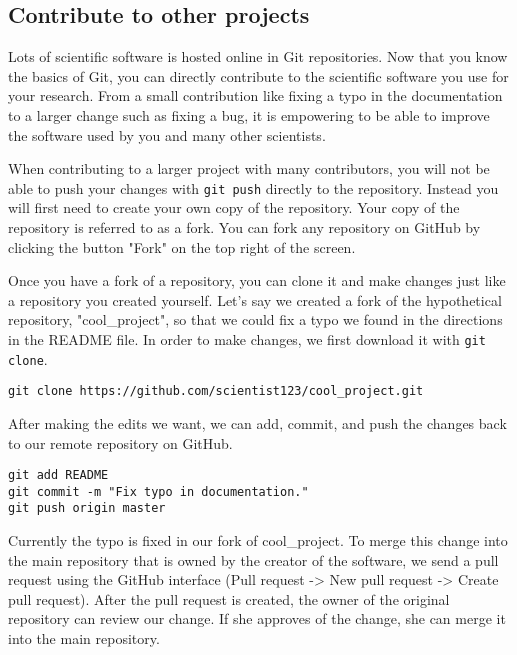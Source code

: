 \subsection{Contribute to other projects}

Lots of scientific software is hosted online in Git repositories.
Now that you know the basics of Git, you can directly contribute to the scientific software you use for your research.
From a small contribution like fixing a typo in the documentation to a larger change such as fixing a bug, it is empowering to be able to improve the software used by you and many other scientists.

When contributing to a larger project with many contributors, you will not be able to push your changes with \verb|git push| directly to the repository.
Instead you will first need to create your own copy of the repository.
Your copy of the repository is referred to as a fork.
You can fork any repository on GitHub by clicking the button "Fork" on the top right of the screen.

Once you have a fork of a repository, you can clone it and make changes just like a repository you created yourself.
Let's say we created a fork of the hypothetical repository, "cool\_project", so that we could fix a typo we found in the directions in the README file.
In order to make changes, we first download it with \verb|git clone|.

\begin{lstlisting}
git clone https://github.com/scientist123/cool_project.git
\end{lstlisting}

After making the edits we want, we can add, commit, and push the changes back to our remote repository on GitHub.

\begin{lstlisting}
git add README
git commit -m "Fix typo in documentation."
git push origin master
\end{lstlisting}

Currently the typo is fixed in our fork of cool\_project.
To merge this change into the main repository that is owned by the creator of the software, we send a pull request using the GitHub interface (Pull request -> New pull request -> Create pull request).
After the pull request is created, the owner of the original repository can review our change.
If she approves of the change, she can merge it into the main repository.
